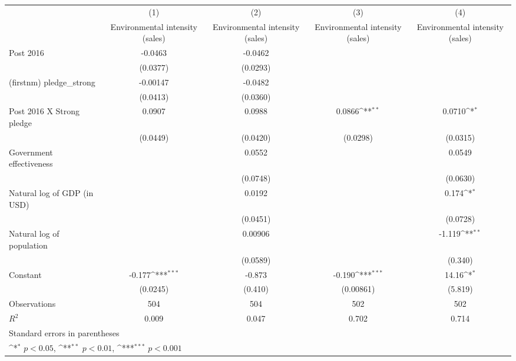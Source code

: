 {
\def\sym#1{\ifmmode^{#1}\else\(^{#1}\)\fi}
\begin{tabular}{l*{4}{c}}
\hline\hline
                    &\multicolumn{1}{c}{(1)}&\multicolumn{1}{c}{(2)}&\multicolumn{1}{c}{(3)}&\multicolumn{1}{c}{(4)}\\
                    &\multicolumn{1}{c}{Environmental intensity (sales)}&\multicolumn{1}{c}{Environmental intensity (sales)}&\multicolumn{1}{c}{Environmental intensity (sales)}&\multicolumn{1}{c}{Environmental intensity (sales)}\\
\hline
Post 2016           &     -0.0463         &     -0.0462         &                     &                     \\
                    &    (0.0377)         &    (0.0293)         &                     &                     \\
[1em]
(firstnm) pledge\_strong&    -0.00147         &     -0.0482         &                     &                     \\
                    &    (0.0413)         &    (0.0360)         &                     &                     \\
[1em]
Post 2016 X Strong pledge&      0.0907         &      0.0988         &      0.0866\sym{**} &      0.0710\sym{*}  \\
                    &    (0.0449)         &    (0.0420)         &    (0.0298)         &    (0.0315)         \\
[1em]
Government effectiveness&                     &      0.0552         &                     &      0.0549         \\
                    &                     &    (0.0748)         &                     &    (0.0630)         \\
[1em]
Natural log of GDP (in USD)&                     &      0.0192         &                     &       0.174\sym{*}  \\
                    &                     &    (0.0451)         &                     &    (0.0728)         \\
[1em]
Natural log of population&                     &     0.00906         &                     &      -1.119\sym{**} \\
                    &                     &    (0.0589)         &                     &     (0.340)         \\
[1em]
Constant            &      -0.177\sym{***}&      -0.873         &      -0.190\sym{***}&       14.16\sym{*}  \\
                    &    (0.0245)         &     (0.410)         &   (0.00861)         &     (5.819)         \\
\hline
Observations        &         504         &         504         &         502         &         502         \\
\(R^{2}\)           &       0.009         &       0.047         &       0.702         &       0.714         \\
\hline\hline
\multicolumn{5}{l}{\footnotesize Standard errors in parentheses}\\
\multicolumn{5}{l}{\footnotesize \sym{*} \(p<0.05\), \sym{**} \(p<0.01\), \sym{***} \(p<0.001\)}\\
\end{tabular}
}
